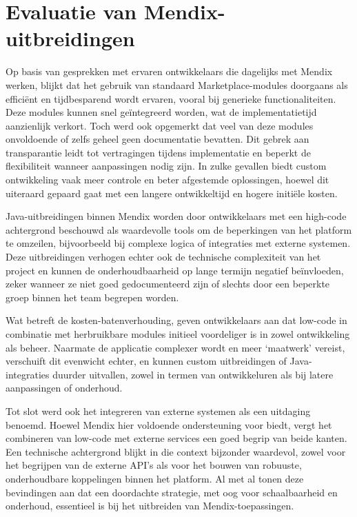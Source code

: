 \section{Evaluatie van Mendix-uitbreidingen}
Op basis van gesprekken met ervaren ontwikkelaars die dagelijks met Mendix werken, blijkt dat het gebruik van standaard Marketplace-modules doorgaans als efficiënt en tijdbesparend wordt ervaren, vooral bij generieke functionaliteiten. Deze modules kunnen snel geïntegreerd worden, wat de implementatietijd aanzienlijk verkort. Toch werd ook opgemerkt dat veel van deze modules onvoldoende of zelfs geheel geen documentatie bevatten. Dit gebrek aan transparantie leidt tot vertragingen tijdens implementatie en beperkt de flexibiliteit wanneer aanpassingen nodig zijn. In zulke gevallen biedt custom ontwikkeling vaak meer controle en beter afgestemde oplossingen, hoewel dit uiteraard gepaard gaat met een langere ontwikkeltijd en hogere initiële kosten.

Java-uitbreidingen binnen Mendix worden door ontwikkelaars met een high-code achtergrond beschouwd als waardevolle tools om de beperkingen van het platform te omzeilen, bijvoorbeeld bij complexe logica of integraties met externe systemen. Deze uitbreidingen verhogen echter ook de technische complexiteit van het project en kunnen de onderhoudbaarheid op lange termijn negatief beïnvloeden, zeker wanneer ze niet goed gedocumenteerd zijn of slechts door een beperkte groep binnen het team begrepen worden.

Wat betreft de kosten-batenverhouding, geven ontwikkelaars aan dat low-code in combinatie met herbruikbare modules initieel voordeliger is in zowel ontwikkeling als beheer. Naarmate de applicatie complexer wordt en meer ‘maatwerk’ vereist, verschuift dit evenwicht echter, en kunnen custom uitbreidingen of Java-integraties duurder uitvallen, zowel in termen van ontwikkeluren als bij latere aanpassingen of onderhoud.

Tot slot werd ook het integreren van externe systemen als een uitdaging benoemd. Hoewel Mendix hier voldoende ondersteuning voor biedt, vergt het combineren van low-code met externe services een goed begrip van beide kanten. Een technische achtergrond blijkt in die context bijzonder waardevol, zowel voor het begrijpen van de externe API’s als voor het bouwen van robuuste, onderhoudbare koppelingen binnen het platform. Al met al tonen deze bevindingen aan dat een doordachte strategie, met oog voor schaalbaarheid en onderhoud, essentieel is bij het uitbreiden van Mendix-toepassingen.

